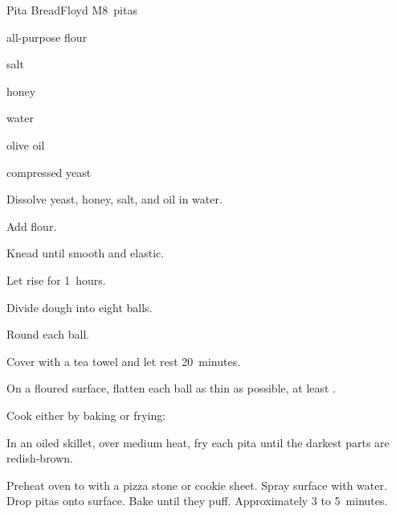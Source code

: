 \begin{recipe}{Pita Bread}{Floyd M}{8~pitas}

\begin{ingredients}
\item {} all-purpose flour
\item {} salt
\item {} honey
\item {} water
\item {} olive oil
\item {} compressed yeast
\end{ingredients}

\begin{directions}
\item Dissolve yeast, honey, salt, and oil in water.
\item Add flour.
\item Knead until smooth and elastic.
\item Let rise for 1\half{}~hours.
\item Divide dough into eight balls.
\item Round each ball.
\item Cover with a tea towel and let rest 20~minutes.
\item On a floured surface, flatten each ball as thin as possible, at least \inch{\quarter}.
\item Cook either by baking or frying:
\begin{itemize*}
\item In an oiled skillet, over medium heat, fry each pita until the darkest parts are redish-brown.
\item Preheat oven to  with a pizza stone or cookie sheet. Spray surface with water. Drop pitas onto surface. Bake until they puff. Approximately 3 to 5~minutes.
\end{itemize*}
\end{directions}

\end{recipe}

